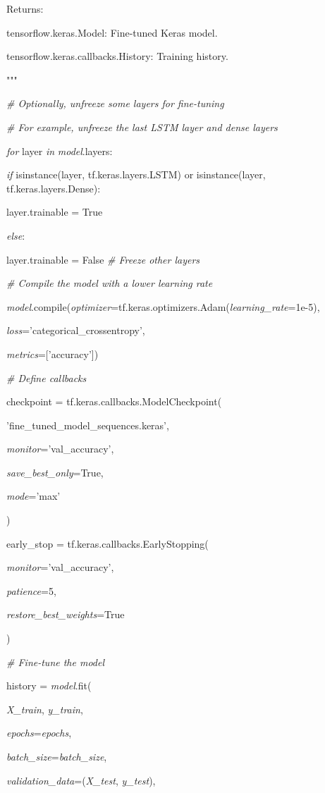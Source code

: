 \documentclass[
]{article}
\begin{document}
Returns:

tensorflow.keras.Model: Fine-tuned Keras model.

tensorflow.keras.callbacks.History: Training history.

"""

\emph{\# Optionally, unfreeze some layers for fine-tuning}

\emph{\# For example, unfreeze the last LSTM layer and dense layers}

\emph{for} layer \emph{in} \emph{model}.layers:

\emph{if} isinstance(layer, tf.keras.layers.LSTM) or isinstance(layer, tf.keras.layers.Dense):

layer.trainable = True

\emph{else}:

layer.trainable = False \emph{\# Freeze other layers}

\emph{\# Compile the model with a lower learning rate}

\emph{model}.compile(\emph{optimizer}=tf.keras.optimizers.Adam(\emph{learning\_rate}=1e-5),

\emph{loss}='categorical\_crossentropy',

\emph{metrics}={[}'accuracy'{]})

\emph{\# Define callbacks}

checkpoint = tf.keras.callbacks.ModelCheckpoint(

'fine\_tuned\_model\_sequences.keras',

\emph{monitor}='val\_accuracy',

\emph{save\_best\_only}=True,

\emph{mode}='max'

)

early\_stop = tf.keras.callbacks.EarlyStopping(

\emph{monitor}='val\_accuracy',

\emph{patience}=5,

\emph{restore\_best\_weights}=True

)

\emph{\# Fine-tune the model}

history = \emph{model}.fit(

\emph{X\_train}, \emph{y\_train},

\emph{epochs}=\emph{epochs},

\emph{batch\_size}=\emph{batch\_size},

\emph{validation\_data}=(\emph{X\_test}, \emph{y\_test}),
\end{document}
